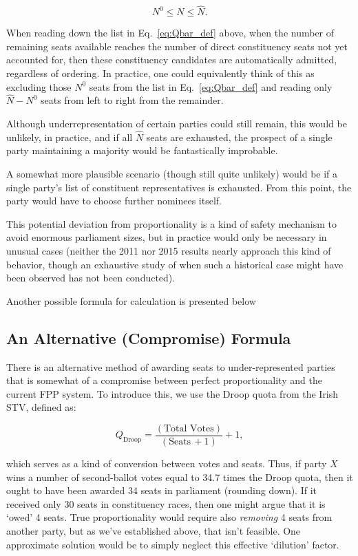 \documentclass[DIV=calc, paper=a4, fontsize=11pt, twocolumn]{scrartcl}	 %
\begin{document}
\begin{equation}
\label{eq:Nlimits}
N^0 \le N \le \hat N.
\end{equation}


When reading down the list in Eq.~\ref{eq:Qbar_def} above, when the number of remaining seats available  reaches the number of direct constituency seats not yet accounted for, then these constituency candidates are automatically admitted, regardless of ordering. In practice, one could equivalently think of this as excluding those $N^0$ seats from the list in Eq.~\ref{eq:Qbar_def} and reading only $\hat N - N^0$ seats from left to right from the remainder. 

Although underrepresentation of certain parties could still remain, this would be unlikely, in practice, and if all $\hat N$ seats are exhausted, the prospect of a single party maintaining a majority would be fantastically improbable.

A somewhat more plausible scenario (though still quite unlikely) would be if a single party's list of constituent representatives is exhausted. From this point, the party would have to choose further nominees itself.

This potential deviation from proportionality is a kind of safety mechanism to avoid enormous parliament sizes, but in practice would only be necessary in unusual cases (neither the 2011 nor 2015 results nearly approach this kind of behavior, though an exhaustive study of when such a historical case might have been observed has not been conducted).

Another possible formula for calculation is presented below
\subsection{An Alternative (Compromise) Formula}

There is an alternative method of awarding seats to under-represented parties that is somewhat of a compromise between perfect proportionality and the current FPP system. To introduce this, we use the Droop quota from the Irish STV, defined as:

\begin{equation}
\label{eq:Droop_def}
Q_{ \textrm{Droop} } =\frac{ \left( \textrm{Total} \,\, \textrm{Votes} \right)}{ \left( \textrm{Seats} \,+1\right)} +1,
\end{equation}

which serves as a kind of conversion between votes and seats. Thus, if party $X$ wins a number of second-ballot votes equal to 34.7 times the Droop quota, then it ought to have been awarded 34 seats in parliament (rounding down). If it received only 30 seats in constituency races, then one might argue that it is `owed' 4 seats. 
True proportionality would require also \emph{removing} 4 seats from another party, but as we've established above, that isn't feasible. 
One approximate solution would be to simply neglect this effective `dilution' factor. 
\end{document}
